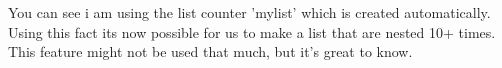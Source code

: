 \documentclass{article}
\begin{document}
You can see i am using the list counter 'mylist' which is created automatically. Using this fact its now possible for us to make a list that are nested 10+ times. This feature might not be used that much, but it's great to know.
\newpage



\end{document}
